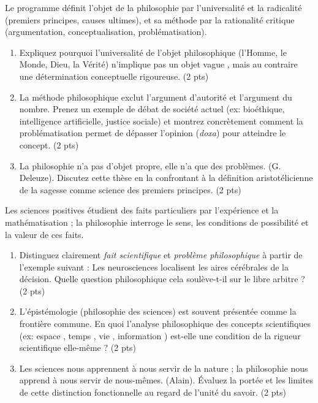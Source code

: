 \documentclass[11pt]{article}
\begin{document}
\begin{exercice}
Le programme définit l'objet de la philosophie par l'universalité et la radicalité (premiers principes, causes ultimes), et sa méthode par la rationalité critique (argumentation, conceptualisation, problématisation).
\begin{enumerate}
    \item Expliquez pourquoi l'universalité de l'objet philosophique (l'Homme, le Monde, Dieu, la Vérité) n'implique pas un objet \og vague \fg, mais au contraire une détermination conceptuelle rigoureuse. (2 pts)
    \item La méthode philosophique exclut l'argument d'autorité et l'argument du nombre. Prenez un exemple de débat de société actuel (ex: bioéthique, intelligence artificielle, justice sociale) et montrez concrètement comment la problématisation permet de dépasser l'opinion (\textit{doxa}) pour atteindre le concept. (2 pts)
    \item \og La philosophie n'a pas d'objet propre, elle n'a que des problèmes. \fg (G. Deleuze). Discutez cette thèse en la confrontant à la définition aristotélicienne de la sagesse comme science des premiers principes. (2 pts)
\end{enumerate}
\end{exercice}

\begin{exercice}
Les sciences positives étudient des faits particuliers par l'expérience et la mathématisation ; la philosophie interroge le sens, les conditions de possibilité et la valeur de ces faits.
\begin{enumerate}
    \item Distinguez clairement \textit{fait scientifique} et \textit{problème philosophique} à partir de l'exemple suivant : \og Les neurosciences localisent les aires cérébrales de la décision. \fg Quelle question philosophique cela soulève-t-il sur le libre arbitre ? (2 pts)
    \item L'épistémologie (philosophie des sciences) est souvent présentée comme la frontière commune. En quoi l'analyse philosophique des concepts scientifiques (ex: \og espace \fg, \og temps \fg, \og vie \fg, \og information \fg) est-elle une condition de la rigueur scientifique elle-même ? (2 pts)
    \item \og Les sciences nous apprennent à nous servir de la nature ; la philosophie nous apprend à nous servir de nous-mêmes. \fg (Alain). Évaluez la portée et les limites de cette distinction fonctionnelle au regard de l'unité du savoir. (2 pts)
\end{enumerate}
\end{exercice}
\end{document}
